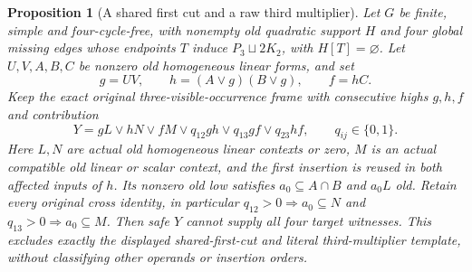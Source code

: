 \documentclass[11pt]{article}
\newtheorem{proposition}[theorem]{Proposition}
\theoremstyle{definition}
\theoremstyle{remark}
\begin{document}
\begin{proposition}[A shared first cut and a raw third multiplier]\label{prop:sharedcutrawchain}
Let $G$ be finite, simple and four-cycle-free, with nonempty old quadratic support $H$ and four global missing edges whose endpoints $T$ induce $P_3\sqcup2K_2$, with $H[T]=\varnothing$. Let $U,V,A,B,C$ be nonzero old homogeneous linear forms, and set
\[
 g=UV,\qquad h=(A\vee g)(B\vee g),\qquad f=hC.
\]
Keep the exact original three-visible-occurrence frame with consecutive highs $g,h,f$ and contribution
\[
 Y=gL\vee hN\vee fM\vee q_{12}gh\vee q_{13}gf\vee q_{23}hf,
 \qquad q_{ij}\in\{0,1\}.
\]
Here $L,N$ are actual old homogeneous linear contexts or zero, $M$ is an actual compatible old linear or scalar context, and the first insertion is reused in both affected inputs of $h$. Its nonzero old low satisfies $a_0\subseteq A\cap B$ and $a_0L$ old. Retain every original cross identity, in particular $q_{12}>0\Rightarrow a_0\subseteq N$ and $q_{13}>0\Rightarrow a_0\subseteq M$. Then safe $Y$ cannot supply all four target witnesses. This excludes exactly the displayed shared-first-cut and literal third-multiplier template, without classifying other operands or insertion orders.
\end{proposition}
\end{document}

